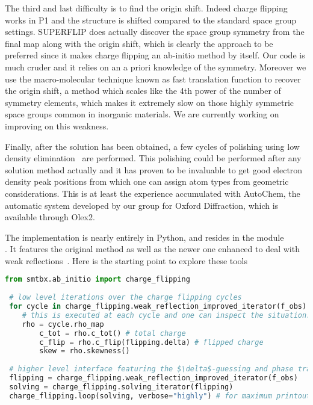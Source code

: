 \documentclass[12pt]{article}
\begin{document}
The third and last difficulty is to find the origin shift. Indeed charge flipping works in P1 and the structure is shifted compared to the standard space group settings. SUPERFLIP does actually discover the space group symmetry from the final map along with the origin shift, which is clearly the approach to be preferred since it makes charge flipping an ab-initio method by itself. Our code is much cruder and it relies on an a priori knowledge of the symmetry. Moreover we use the macro-molecular technique known as fast translation function to recover the origin shift, a method which scales like the 4th power of the number of symmetry elements, which makes it extremely slow on those highly symmetric space groups common in inorganic materials. We are currently working on improving on this weakness.

Finally, after the solution has been obtained, a few cycles of polishing using low density elimination~\cite{Shiono:1992} are performed. This polishing could be performed after any solution method actually and it has proven to be invaluable to get good electron density peak positions from which one can assign atom types from geometric considerations. This is at least the experience accumulated with AutoChem, the automatic system developed by our group for Oxford Diffraction, which is available through Olex2.

The implementation is nearly entirely in Python, and resides in the module\\ . It features the original method as well as the newer one enhanced to deal with weak reflections~\cite{Oszlanyi:2004}. Here is the starting point to explore these tools
 \begin{lstlisting}[language=Python]
 from smtbx.ab_initio import charge_flipping
 
 # low level iterations over the charge flipping cycles
 for cycle in charge_flipping.weak_reflection_improved_iterator(f_obs):
 	# this is executed at each cycle and one can inspect the situation:
	rho = cycle.rho_map
        c_tot = rho.c_tot() # total charge
        c_flip = rho.c_flip(flipping.delta) # flipped charge
        skew = rho.skewness()
 
 # higher level interface featuring the $\delta$-guessing and phase transition detection
 flipping = charge_flipping.weak_reflection_improved_iterator(f_obs)
 solving = charge_flipping.solving_iterator(flipping)
 charge_flipping.loop(solving, verbose="highly") # for maximum printout 
\end{lstlisting}
\end{document}
